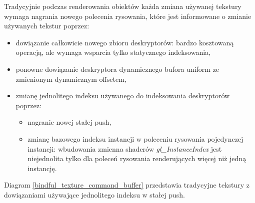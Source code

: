 Tradycyjnie podczas renderowania obiektów każda zmiana używanej tekstury wymaga nagrania nowego polecenia rysowania, które jest informowane o zmianie używanych tekstur poprzez:
\begin{itemize}
	\item dowiązanie całkowicie nowego zbioru deskryptorów: bardzo kosztowaną operacją, ale wymaga wsparcia tylko statycznego indeksowania,
	\item ponowne dowiązanie deskryptora dynamicznego bufora uniform ze zmienionym dynamicznym offsetem,
	\item zmianę jednolitego indeksu używanego do indeksowania deskryptorów poprzez:
	\begin{itemize}
		\item nagranie nowej stałej push,
		\item zmianę bazowego indeksu instancji w poleceniu rysowania pojedynczej instancji: wbudowania zmienna shaderów \textit{gl\_InstanceIndex} jest niejednolita tylko dla poleceń rysowania renderujących więcej niż jedną instancję.
	\end{itemize}
\end{itemize}
Diagram \ref{bindful_texture_command_buffer} przedstawia tradycyjne tekstury z dowiązaniami używające jednolitego indeksu w stałej push.
